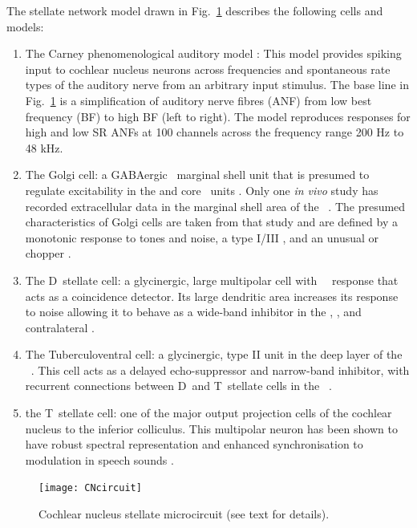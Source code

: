   The stellate
network model drawn in Fig.~\ref{fig:microcircuit} describes the following cells
and models:
\begin{enumerate}
\item The Carney phenomenological auditory model \citet{ZilanyBruceEtAl:2009}:
  This model provides spiking input to cochlear nucleus neurons across
  frequencies and spontaneous rate types of the auditory nerve from an arbitrary
  input stimulus. The base line in Fig.~\ref{fig:microcircuit} is a
  simplification of auditory nerve fibres (ANF) from low best frequency (BF) to
  high BF (left to right). The model reproduces responses for high and low SR
  ANFs at 100 channels across the frequency range 200 Hz to 48 kHz.
\item The Golgi cell: a {GABA}ergic \VCN~marginal shell unit that is presumed to
  regulate excitability in the \GCD and core \VCN~units
  \citep{FerragamoGoldingEtAl:1998}. Only one \textit{in vivo} study has
  recorded extracellular data in the marginal shell area of the
  \CN~\citep{GhoshalKim:1997}. The presumed characteristics of Golgi cells are
  taken from that study and are defined by a monotonic response to tones and
  noise, a type I/III \EIRA, and an unusual or chopper {\PSTH}.
\item The D~stellate cell: a glycinergic, large multipolar cell with
  \OnC~\PSTH~response that acts as a coincidence detector. Its large
  dendritic area increases its response to noise allowing it to behave as a
  wide-band inhibitor in the \VCN, \DCN, and contralateral \CN
  \citep{SmithMassieEtAl:2005,ArnottWallaceEtAl:2004,NeedhamPaolini:2007}.
\item The Tuberculoventral cell: a glycinergic, type II {\EIRA} unit in the deep
  layer of the \DCN~\citep{SpirouDavisEtAl:1999}.  This cell acts as a delayed
  echo-suppressor and narrow-band inhibitor, with recurrent connections between
  D~and T~stellate cells in the \VCN~\citep{Alibardi:2006,OertelWickesberg:1993,WickesbergWhitlonEtAl:1991}.
\item the T~stellate cell: one of the major output projection cells of the
  cochlear nucleus to the inferior colliculus. This multipolar neuron has been
  shown to have robust spectral representation and enhanced synchronisation to
  modulation in speech sounds
  \citep{BlackburnSachs:1990,KeilsonRichardsEtAl:1997}.
\end{enumerate}

\begin{figure}[htb]
  \centering
  \texttt{[image: CNcircuit]}
  \caption[Cochlear nucleus stellate microcircuit]{Cochlear nucleus stellate microcircuit (see text for details). }
  \label{fig:microcircuit}
\end{figure}

